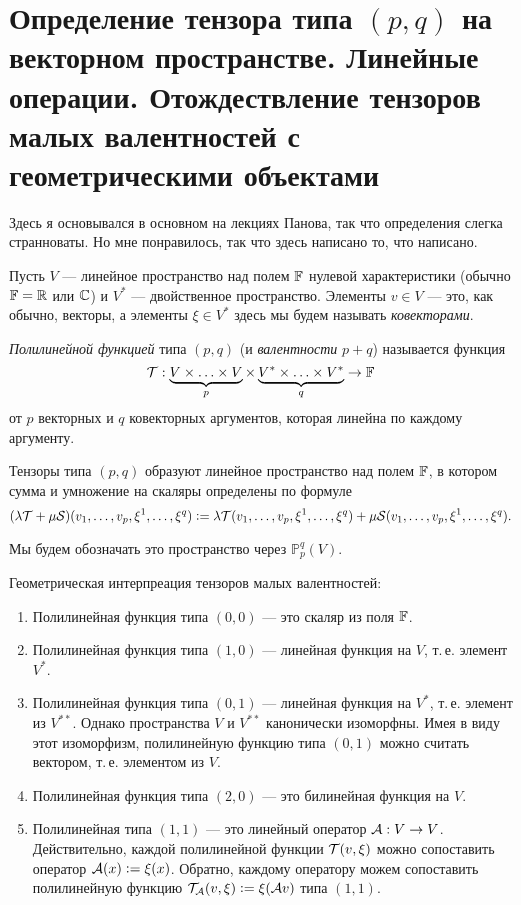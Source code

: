 \section{Определение тензора типа $(p, q)$ на векторном пространстве. Линейные операции. Отождествление тензоров малых валентностей с геометрическими объектами}

Здесь я основывался в основном на лекциях Панова, так что определения слегка странноваты. Но мне понравилось, так что здесь написано то, что написано.

Пусть $V$ --- линейное пространство над полем $\mathbb{F}$ нулевой характеристики (обычно $\mathbb{F} = \mathbb{R}$ или $\mathbb{C}$) и $V^\ast$ --- двойственное пространство. Элементы $v \in V$ --- это, как обычно, векторы, а элементы $\xi \in V^\ast$ здесь мы будем называть \textit{ковекторами}.

\begin{definition}
    \textit{Полилинейной функцией} типа $(p, q)$ (и \textit{валентности} $p + q$) называется функция
    \[
        \mathcal{T}: \underbrace{V \times \ldots \times V}_p \times \underbrace{V^\ast \times \ldots \times V^\ast}_q \to \mathbb{F}
    \]
    от $p$ векторных и $q$ ковекторных аргументов, которая линейна по каждому аргументу.
\end{definition}

Тензоры типа $(p, q)$ образуют линейное пространство над полем $\mathbb{F}$, в котором сумма и умножение на скаляры определены по формуле
\[
    (\lambda\mathcal{T} + \mu\mathcal{S})(v_1, \ldots, v_p, \xi^1, \ldots, \xi^q) \vcentcolon = \lambda\mathcal{T}(v_1, \ldots, v_p, \xi^1, \ldots, \xi^q) + \mu\mathcal{S}(v_1, \ldots, v_p, \xi^1, \ldots, \xi^q).
\]

Мы будем обозначать это пространство через $\mathbb{P}_p^q(V)$.

\begin{example}
    Геометрическая интерпреация тензоров малых валентностей:
    \begin{enumerate}
        \item Полилинейная функция типа $(0, 0)$ --- это скаляр из поля $\mathbb{F}$.
        \item Полилинейная функция типа $(1, 0)$ --- линейная функция на $V$, т.\,е. элемент $V^\ast$.
        \item Полилинейная функция типа $(0, 1)$ --- линейная функция на $V^\ast$, т.\,е. элемент из $V^{\ast\ast}$. Однако пространства $V$ и $V^{\ast\ast}$ канонически изоморфны. Имея в виду этот изоморфизм, полилинейную функцию типа $(0, 1)$ можно считать вектором, т.\,е. элементом из $V$.
        \item Полилинейная функция типа $(2, 0)$ --- это билинейная функция на $V$.
        \item Полилинейная типа $(1, 1)$ --- это линейный оператор $\mathcal{A}: V \to V$. Действительно, каждой полилинейной функции $\mathcal{T}(v, \xi)$ можно сопоставить оператор $\mathcal{A}(x) \vcentcolon = \xi(x)$. Обратно, каждому оператору можем сопоставить полилинейную функцию $\mathcal{T}_{\mathcal{A}}(v, \xi) \vcentcolon = \xi(\mathcal{A} v)$ типа $(1, 1)$.
    \end{enumerate}
\end{example}

